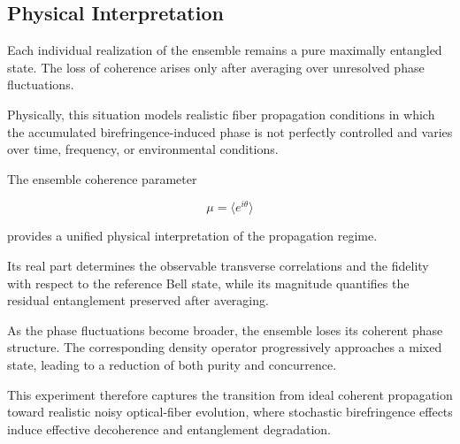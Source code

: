 
\subsection*{Physical Interpretation}

Each individual realization of the ensemble remains a pure maximally entangled state. The loss of coherence arises only after averaging over unresolved phase fluctuations.

Physically, this situation models realistic fiber propagation conditions in which the accumulated birefringence-induced phase is not perfectly controlled and varies over time, frequency, or environmental conditions.

The ensemble coherence parameter

\[
\mu
=
\langle e^{i\theta} \rangle
\]

provides a unified physical interpretation of the propagation regime.

Its real part determines the observable transverse correlations and the fidelity with respect to the reference Bell state, while its magnitude quantifies the residual entanglement preserved after averaging.

As the phase fluctuations become broader, the ensemble loses its coherent phase structure. The corresponding density operator progressively approaches a mixed state, leading to a reduction of both purity and concurrence.

This experiment therefore captures the transition from ideal coherent propagation toward realistic noisy optical-fiber evolution, where stochastic birefringence effects induce effective decoherence and entanglement degradation.